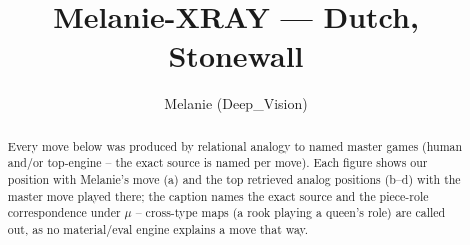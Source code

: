 \documentclass[11pt]{article}
\title{Melanie-XRAY — Dutch, Stonewall}
\author{Melanie (Deep\_Vision)}
\date{}
\begin{document}
\maketitle

\begin{abstract}Every move below was produced by relational analogy to named master games (human and/or top-engine -- the exact source is named per move). Each figure shows our position with Melanie's move (a) and the top retrieved analog positions (b--d) with the master move played there; the caption names the exact source and the piece-role correspondence under $\mu$ -- cross-type maps (a rook playing a queen's role) are called out, as no material/eval engine explains a move that way.\end{abstract}

\begin{figure}[p]\centering
\begin{subfigure}{0.46\textwidth}\centering
\resizebox{\linewidth}{!}{%
\newchessgame
\chessboard[
  setfen={rnbqk2r/pp4pp/2pbpn2/3P1p2/3P4/5NP1/PP2PPBP/RNBQ1RK1 b kq - 0 7},
  showmover=false,
  pgfstyle=straightmove, color=movearrow, markmove={e6-d5}
]}
\caption{}
\end{subfigure}\hfill
\begin{subfigure}{0.46\textwidth}\centering
\resizebox{\linewidth}{!}{%
\newchessgame
\chessboard[
  setfen={rnbq1rk1/pp3pbp/3p1np1/2pp4/2P1P3/2N1BP2/PP1Q2PP/R3KBNR w KQ - 0 9},
  showmover=false,
  pgfstyle=straightmove, color=movearrow, markmove={c4-d5}
]}
\caption{}
\end{subfigure}
\\[4pt]
\begin{subfigure}{0.46\textwidth}\centering
\resizebox{\linewidth}{!}{%
\newchessgame
\chessboard[
  setfen={rnbq1rk1/pp3pbp/3p1np1/2pp4/2P1P3/2N1BP2/PP1Q2PP/R3KBNR w KQ - 0 9},
  showmover=false,
  pgfstyle=straightmove, color=movearrow, markmove={c4-d5}
]}
\caption{}
\end{subfigure}\hfill
\begin{subfigure}{0.46\textwidth}\centering
\resizebox{\linewidth}{!}{%
\newchessgame
\chessboard[
  setfen={rnbq1rk1/pp3pbp/3p1np1/2pp4/2P1P3/2N1BP2/PP4PP/RN1QKB1R w KQ - 0 9},
  showmover=false,
  pgfstyle=straightmove, color=movearrow, markmove={c4-d5}
]}
\caption{}
\end{subfigure}

\end{figure}
\end{document}
